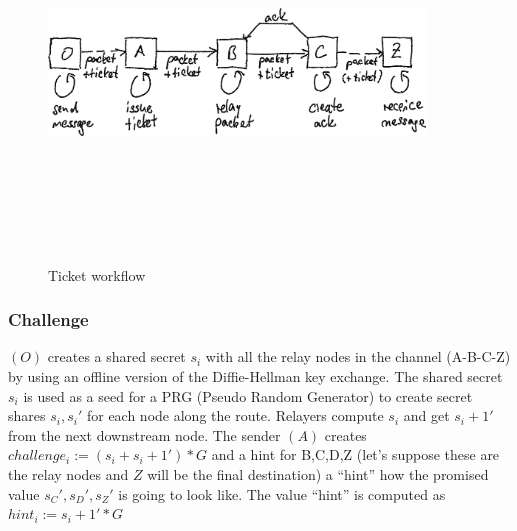  \begin{figure}
    \centering
    \includegraphics[width=10cm,height=10cm,keepaspectratio]{../whitepaper/images/ticket_workflow.png}
    \caption{Ticket workflow}
    \label{fig:Ticket worklow}
    \end{figure}

\subsubsection*{Challenge}
$(O)$ creates a shared secret $s_i$ with all the relay nodes in the channel (A-B-C-Z) by using an offline version of the Diffie-Hellman key exchange.
\newline The shared secret $s_i$ is used as a seed for a PRG (Pseudo Random Generator) to create secret shares $s_i,s_i'$ for each node along the route. 
Relayers compute $s_i$ and get $s_i+1'$ from the next downstream node. 
\newline The sender $(A)$ creates $challenge_i:=(s_i+s_i+1')*G$ and a hint for B,C,D,Z (let’s suppose these are the relay nodes and $Z$ will be the final destination) a “hint” how the promised value $s_C',s_D',s_Z'$ is going to look like. 
The value “hint” is computed as $hint_i:=s_i+1'*G$ 


